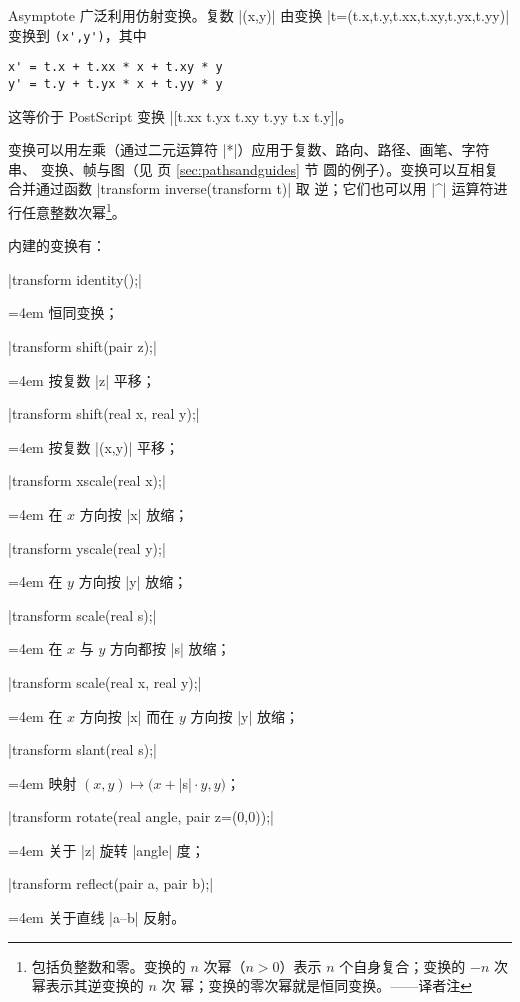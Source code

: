 \documentclass{ctexbook}
\newenvironment{funclist}{\trivlist
  \parindent=0pt
\item[]
  \def\item{\medskip\par\leftskip=0pt}
  \def\go{\par\leftskip=4em}}
{\endtrivlist}
\newcommand*\prgname[1]{\textsf{#1}}
\newcommand\transnote[1]{\footnote{#1——译者注}}
\begin{document}
\prgname{Asymptote} 广泛利用仿射变换。复数 |(x,y)| 由变换
|t=(t.x,t.y,t.xx,t.xy,t.yx,t.yy)| 变换到
\lstinline[stringstyle={\color{black}}]=(x',y')=，其中
\begin{lstlisting}[stringstyle={\color{black}}]
x' = t.x + t.xx * x + t.xy * y
y' = t.y + t.yx * x + t.yy * y
\end{lstlisting}
\lstset{}
这等价于 \prgname{PostScript} 变换 |[t.xx t.yx t.xy t.yy t.x t.y]|。

变换可以用左乘（通过二元运算符 |*|）应用于复数、路向、路径、画笔、字符串、
变换、帧与图（见 \pageref{sec:pathsandguides} 页 \ref{sec:pathsandguides} 节
圆的例子）。变换可以互相复合并通过函数 |transform inverse(transform t)| 取
逆；它们也可以用 |^| 运算符进行任意整数次幂\transnote{包括负整数和零。变换的
$n$ 次幂（$n>0$）表示 $n$ 个自身复合；变换的 $-n$ 次幂表示其逆变换的 $n$ 次
幂；变换的零次幂就是恒同变换。}。

内建的变换有：
\begin{funclist}
\item |transform identity();| \go
  恒同变换；

\item |transform shift(pair z);| \go
  按复数 |z| 平移；

\item |transform shift(real x, real y);| \go
  按复数 |(x,y)| 平移；

\item |transform xscale(real x);| \go
  在 $x$ 方向按 |x| 放缩；

\item |transform yscale(real y);| \go
  在 $y$ 方向按 |y| 放缩；

\item |transform scale(real s);| \go
  在 $x$ 与 $y$ 方向都按 |s| 放缩；

\item |transform scale(real x, real y);| \go
  在 $x$ 方向按 |x| 而在 $y$ 方向按 |y| 放缩；

\item |transform slant(real s);| \go
  映射 $(x,y) \mapsto (x+{}$|s|${}\cdot y, y)$；

\item |transform rotate(real angle, pair z=(0,0));| \go
  关于 |z| 旋转 |angle| 度；

\item |transform reflect(pair a, pair b);| \go
  关于直线 |a--b| 反射。
\end{funclist}
\end{document}
